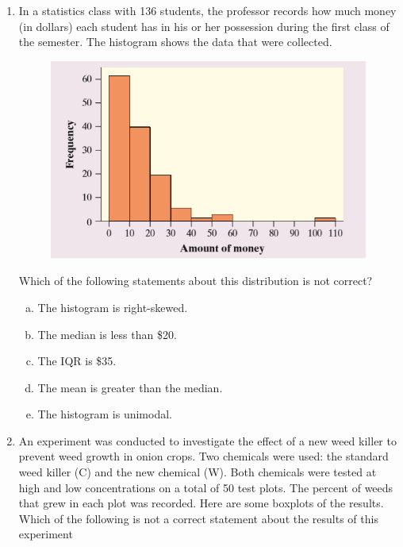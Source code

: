\documentclass[a4paper,12pt,twoside]{book}
\begin{document}
\begin{itemize}
\begin{enumerate}
   \item  In a statistics class with 136 students, the professor records how much money (in dollars) each student has in his or her possession during the first class of the semester. The histogram shows the data that were collected.
   \begin{figure}[H]
   \centering
   \includegraphics[scale=0.6]{figure5}
   \end{figure}

 Which of the following statements about this distribution is not correct? 
 
 \begin{enumerate}[(a), start = 1]
   \item The histogram is right-skewed.
   \item The median is less than \$20.
   \item The IQR is \$35.
   \item The mean is greater than the median.
   \item The histogram is unimodal.
 \end{enumerate}
 \vspace{0.3cm}
 
 \item An experiment was conducted to investigate the effect of a new weed killer to prevent weed growth in onion crops. Two chemicals were used: the standard weed killer (C) and the new chemical (W). Both chemicals were tested at high and low concentrations on a total of 50 test plots. The percent of weeds that grew in each plot was recorded. Here are some boxplots of the results. Which of the following is not a correct statement about the results of this experiment
 

\end{enumerate}
\end{itemize}
\end{document}
